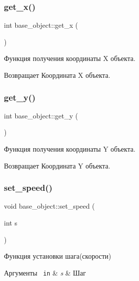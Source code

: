 \subsubsection{\texorpdfstring{get\_x()}{get\_x()}}
{\footnotesize\ttfamily int base\+\_\+object\+::get\+\_\+x (\begin{DoxyParamCaption}{ }\end{DoxyParamCaption})}



Функция получения координаты X объекта. 

\begin{DoxyReturn}{Возвращает}
Координата X объекта. 
\end{DoxyReturn}
\mbox{\label{classbase__object_ad1ff677f0809e24496f87c27ea2c65ec}} 
\subsubsection{\texorpdfstring{get\_y()}{get\_y()}}
{\footnotesize\ttfamily int base\+\_\+object\+::get\+\_\+y (\begin{DoxyParamCaption}{ }\end{DoxyParamCaption})}



Функция получения координаты Y объекта. 

\begin{DoxyReturn}{Возвращает}
Координата Y объекта. 
\end{DoxyReturn}
\mbox{\label{classbase__object_a6aa28faa9734744b5992da58121e6095}} 
\subsubsection{\texorpdfstring{set\_speed()}{set\_speed()}}
{\footnotesize\ttfamily void base\+\_\+object\+::set\+\_\+speed (\begin{DoxyParamCaption}\item[{int}]{s }\end{DoxyParamCaption})}



Функция установки шага(скорости) 


\begin{DoxyParams}[1]{Аргументы}
\mbox{\texttt{ in}}  & {\em s} & Шаг \\
\hline
\end{DoxyParams}


